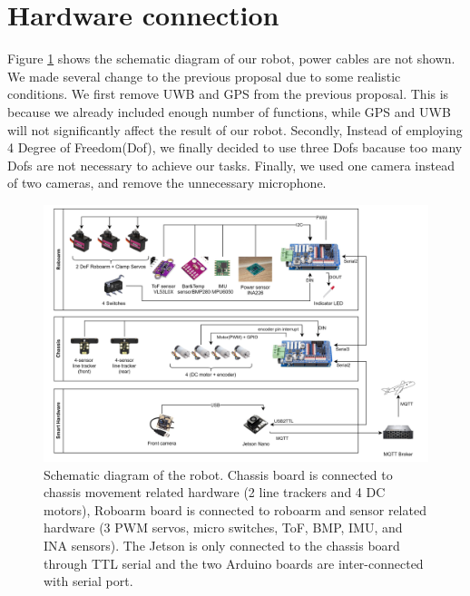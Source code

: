\section{Hardware connection}

Figure \ref{fig:sch} shows the schematic diagram of our robot, power cables are not shown. We made several change to the previous proposal due to some realistic conditions. We first remove UWB and GPS from the previous proposal. This is because we already included enough number of functions, while GPS and UWB will not significantly affect the result of our robot. Secondly, Instead of employing 4 Degree of Freedom(Dof), we finally decided to use three Dofs bacause too many Dofs are not necessary to achieve our tasks. Finally, we used one camera instead of two cameras, and remove the unnecessary microphone.
\begin{figure}[H]
    \centering
    \includegraphics[width=\linewidth]{asset/elec3848_sch.png}
    \caption{
    Schematic diagram of the robot. Chassis board is connected to chassis movement related hardware
    (2 line trackers and 4 DC motors), Roboarm board is connected to roboarm and sensor related hardware
    (3 PWM servos, micro switches, ToF, BMP, IMU, and INA sensors). The Jetson is only connected to the 
    chassis board through TTL serial and the two Arduino boards are inter-connected with serial port.
    }
    \label{fig:sch}
\end{figure}




